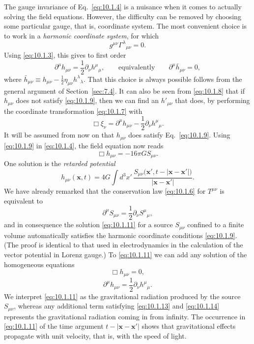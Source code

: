 The gauge invariance of Eq.~\eqref{eq:10.1.4} is a nuisance when it comes to
actually solving the field equations. However, the difficulty can be removed
by choosing some particular gauge, that is, coordinate system. The most
convenient choice is to work in a \emph{harmonic coordinate system}, for which
\[
  g^{\mu\nu}\Gamma^\lambda{}_{\mu\nu}=0.
\]
Using \eqref{eq:10.1.3}, this gives to first order
\begin{equation}
  \partial^\mu h_{\mu\nu}
  =
  \frac12\partial_\nu h^\mu{}_\mu,
  \qquad\text{equivalently}\qquad
  \partial^\mu\bar h_{\mu\nu}=0,
  \tag{10.1.9}\label{eq:10.1.9}
\end{equation}
where
\(\bar h_{\mu\nu}\equiv h_{\mu\nu}
-\frac12\eta_{\mu\nu}h^\lambda{}_\lambda\).
That this choice is always possible follows from the general argument of
Section~\ref{sec:7.4}. It can also be seen from \eqref{eq:10.1.8} that if
\(h_{\mu\nu}\) does not satisfy \eqref{eq:10.1.9}, then we can find an
\(h'_{\mu\nu}\) that does, by performing the coordinate transformation
\eqref{eq:10.1.7} with
\[
  \Box\xi_\nu
  =
  \partial^\mu h_{\mu\nu}
  -\frac12\partial_\nu h^\mu{}_\mu.
\]
It will be assumed from now on that \(h_{\mu\nu}\) does satisfy
Eq.~\eqref{eq:10.1.9}. Using \eqref{eq:10.1.9} in \eqref{eq:10.1.4}, the
field equation now reads
\begin{equation}
  \Box h_{\mu\nu}=-16\pi G S_{\mu\nu}.
  \tag{10.1.10}\label{eq:10.1.10}
\end{equation}
One solution is the \emph{retarded potential}
\begin{equation}
  h_{\mu\nu}(\mathbf{x},t)
  =
  4G\int d^3x'\,
  \frac{S_{\mu\nu}\bigl(\mathbf{x}',t-\lvert\mathbf{x}-\mathbf{x}'\rvert\bigr)}
       {\lvert\mathbf{x}-\mathbf{x}'\rvert}.
  \tag{10.1.11}\label{eq:10.1.11}
\end{equation}
We have already remarked that the conservation law
\eqref{eq:10.1.6} for \(T^{\mu\nu}\) is equivalent to
\begin{equation}
  \partial^\mu S_{\mu\nu}
  =
  \frac12\partial_\nu S^\mu{}_\mu,
  \tag{10.1.12}\label{eq:10.1.12}
\end{equation}
and in consequence the solution \eqref{eq:10.1.11} for a source
\(S_{\mu\nu}\) confined to a finite volume automatically satisfies the
harmonic coordinate conditions \eqref{eq:10.1.9}. (The proof is identical
to that used in electrodynamics in the calculation of the vector potential in
Lorenz gauge.) To \eqref{eq:10.1.11} we can add any solution of the
homogeneous equations
\begin{equation}
  \Box h_{\mu\nu}=0,
  \tag{10.1.13}\label{eq:10.1.13}
\end{equation}
\begin{equation}
  \partial^\mu h_{\mu\nu}
  =
  \frac12\partial_\nu h^\mu{}_\mu.
  \tag{10.1.14}\label{eq:10.1.14}
\end{equation}
We interpret \eqref{eq:10.1.11} as the gravitational radiation produced by
the source \(S_{\mu\nu}\), whereas any additional term satisfying
\eqref{eq:10.1.13} and \eqref{eq:10.1.14} represents the gravitational
radiation coming in from infinity. The occurrence in \eqref{eq:10.1.11} of
the time argument \(t-\lvert\mathbf{x}-\mathbf{x}'\rvert\) shows that
gravitational effects propagate with unit velocity, that is, with the speed
of light.
